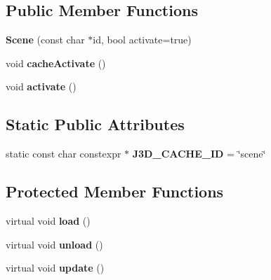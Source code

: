 \subsection*{Public Member Functions}
\begin{DoxyCompactItemize}
\item 
\hypertarget{classj3d_1_1Scene_a3943ddb5181afafce79d85cd3ebbd752}{}{\bfseries Scene} (const char $\ast$id, bool activate=true)\label{classj3d_1_1Scene_a3943ddb5181afafce79d85cd3ebbd752}

\item 
\hypertarget{classj3d_1_1Scene_a300c15b700a256b1ad0e55323b1491f0}{}void {\bfseries cache\+Activate} ()\label{classj3d_1_1Scene_a300c15b700a256b1ad0e55323b1491f0}

\item 
\hypertarget{classj3d_1_1Scene_adf671a288f878e3efa42ccbf34b0d6ed}{}void {\bfseries activate} ()\label{classj3d_1_1Scene_adf671a288f878e3efa42ccbf34b0d6ed}

\end{DoxyCompactItemize}
\subsection*{Static Public Attributes}
\begin{DoxyCompactItemize}
\item 
\hypertarget{classj3d_1_1Scene_ae37dfe706793bf75401ae547de727914}{}static const char constexpr $\ast$ {\bfseries J3\+D\+\_\+\+C\+A\+C\+H\+E\+\_\+\+I\+D} = \char`\"{}scene\char`\"{}\label{classj3d_1_1Scene_ae37dfe706793bf75401ae547de727914}

\end{DoxyCompactItemize}
\subsection*{Protected Member Functions}
\begin{DoxyCompactItemize}
\item 
\hypertarget{classj3d_1_1Scene_a8ef39136a6566bba72a8aef5fd99be1c}{}virtual void {\bfseries load} ()\label{classj3d_1_1Scene_a8ef39136a6566bba72a8aef5fd99be1c}

\item 
\hypertarget{classj3d_1_1Scene_a2fbbca36c8b7063cd6d1e0743da438a9}{}virtual void {\bfseries unload} ()\label{classj3d_1_1Scene_a2fbbca36c8b7063cd6d1e0743da438a9}

\item 
\hypertarget{classj3d_1_1Scene_a79d797457dfb3ef93313bad9b5e5c6fc}{}virtual void {\bfseries update} ()\label{classj3d_1_1Scene_a79d797457dfb3ef93313bad9b5e5c6fc}

\end{DoxyCompactItemize}
